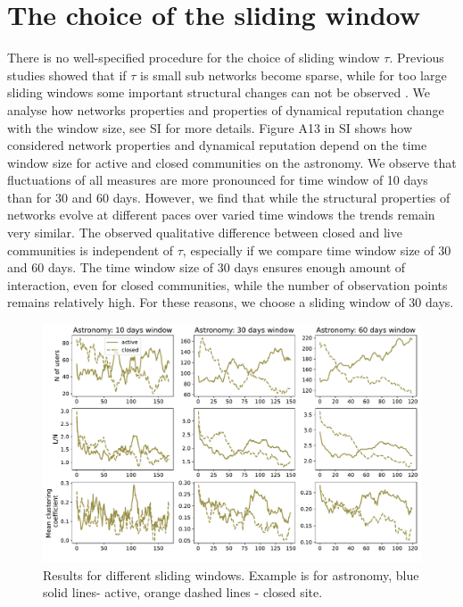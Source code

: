 \chapter{The choice of the sliding window} %

There is no well-specified procedure for the choice of sliding window $\tau$. Previous studies showed that if $\tau$ is small sub networks become sparse, while for too large sliding windows some important structural changes can not be observed \cite{krings2012effects, arnold2021moving}. We analyse how networks properties and properties of dynamical reputation change with the window size, see SI for more details. Figure A13 in SI shows how considered network properties and dynamical reputation depend on the time window size for active and closed communities on the astronomy. We observe that fluctuations of all measures are more pronounced for time window of 10 days than for 30 and 60 days. However, we find that while the structural properties of networks evolve at different paces over varied time windows the trends remain very similar. The observed qualitative difference between closed and live communities is independent of $\tau$, especially if we compare time window size of 30 and 60 days. The time window size of 30 days ensures enough amount of interaction, even for closed communities, while the number of observation points remains relatively high. For these reasons, we choose a sliding window of 30 days. 

\begin{figure}[h!]
	\centering
	\includegraphics[width=0.9\linewidth]{figures/stackexchange/sliding_window_network.pdf}
	\caption{Results for different sliding windows. Example is for astronomy, blue solid lines- active, orange dashed lines - closed site. }
	\label{fig:windows}
\end{figure}

